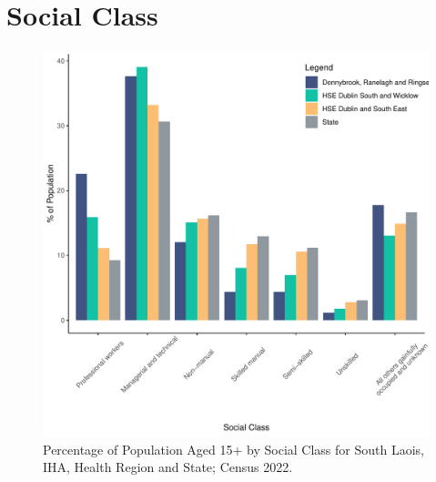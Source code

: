 \documentclass{article}
\begin{document}
\section{Social Class}\label{sect:SC}
\begin{figure}[H]
	\centering
	\includegraphics[width = 140mm]{../figures/SocialClassED.pdf}
	\caption{Percentage of Population Aged 15+ by Social Class for South Laois, IHA, Health Region and State; Census 2022.}
	\label{fig:vbnv}
	\end{figure}
\end{document}
